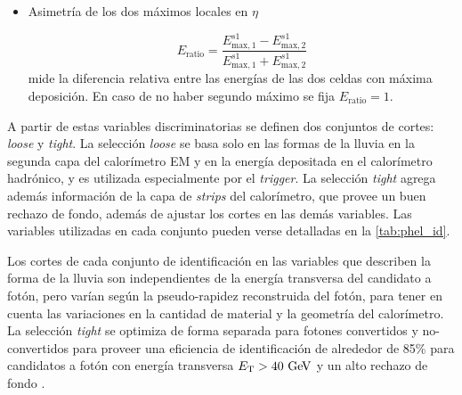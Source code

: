 \begin{itemize}
\item Asimetría de los dos máximos locales en $\eta$

  \begin{equation}
    E_\mathrm{ratio} = \frac{ E^{s1}_{\mathrm{max},1} - E^{s1}_{\mathrm{max},2} }{ E^{s1}_{\mathrm{max},1} + E^{s1}_{\mathrm{max},2} }
  \end{equation}
  mide la diferencia relativa entre las energías de las dos celdas con máxima
  deposición. En caso de no haber segundo máximo se fija $E_\mathrm{ratio} = 1$.

\end{itemize}


A partir de estas variables discriminatorias se definen dos conjuntos de cortes:
\emph{loose} y \emph{tight}.
La selección \emph{loose} se basa solo en las formas de la lluvia
en la segunda capa del calorímetro EM y en la energía depositada en el
calorímetro hadrónico, y es utilizada especialmente por el \emph{trigger}. La selección
\emph{tight} agrega además información de la capa de \emph{strips} del calorímetro, que
provee un buen rechazo de fondo, además de ajustar los cortes en las
demás variables. Las variables utilizadas en cada conjunto pueden verse detalladas
en la \cref{tab:phel_id}.

Los cortes de cada conjunto de identificación en las variables que
describen la forma de la lluvia son independientes de la energía transversa del
candidato a fotón, pero varían según la pseudo-rapidez reconstruida del fotón,
para tener en cuenta las variaciones en la cantidad de material y la geometría
del calorímetro.
La selección \emph{tight} se optimiza de forma separada para
fotones convertidos y no-convertidos para proveer una eficiencia de
identificación de alrededor de 85\% para candidatos a fotón con energía
transversa $\et>40 \gev$ y un alto rechazo de fondo \cite{Delmastro:1747242}.



